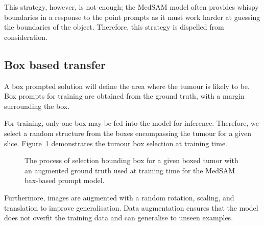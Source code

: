 \documentclass[12pt,twoside]{report}
\begin{document}
This strategy, however, is not enough; the MedSAM model often provides whispy boundaries in a response to the point prompts as it must work harder at guessing the boundaries of the object. Therefore, this strategy is dispelled from consideration.

\subsection{Box based transfer}

A box prompted solution will define the area where the tumour is likely to be. Box prompts for training are obtained from the ground truth, with a margin surrounding the box. 

For training, only one box may be fed into the model for inference. Therefore, we select a random structure from the boxes encompassing the tumour for a given slice. Figure~\ref{fig:box-prompt-sam-selection} demonstrates the tumour box selection at training time. 

\begin{figure}[H]
  \centering
  \caption{The process of selection bounding box for a given boxed tumor with an augmented ground truth used at training time for the MedSAM bax-based prompt model.}\label{fig:box-prompt-sam-selection}
\end{figure}

Furthermore, images are augmented with a random rotation, scaling, and translation to improve generalisation. Data augmentation ensures that the model does not overfit the training data and can generalise to unseen examples.
\end{document}
